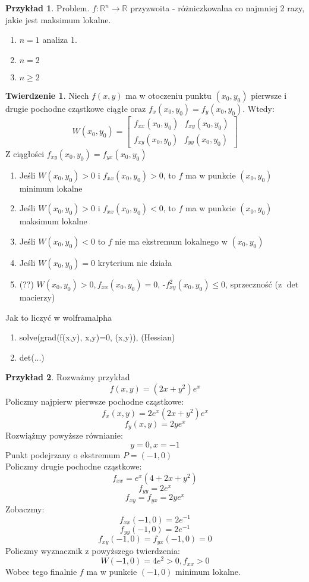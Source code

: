 \documentclass{article}
\theoremstyle{definition}
\theoremstyle{definition}
\newtheorem{tw}{Twierdzenie}[subsection]
\theoremstyle{definition}
\newtheorem{pk}{Przykład}[subsection]
\theoremstyle{definition}
\begin{document}
\begin{pk}
    Problem. $f: \mathbb{R}^n \rightarrow \mathbb{R}$ przyzwoita - różniczkowalna co najmniej 2 razy, jakie jest maksimum lokalne.
    \begin{enumerate}
        \item $n=1$ analiza 1.
        \item $n=2$
        \item $n\geq 2$
    \end{enumerate}
\end{pk}

\begin{tw}
    Niech $f(x,y)$ ma w otoczeniu punktu $(x_0,y_0)$ pierwsze i drugie pochodne cząstkowe ciągłe oraz $f_x(x_0,y_0)=f_y(x_0,y_0)$. Wtedy:
    \[W(x_0,y_0)= \begin{bmatrix}
        f_{xx} (x_0,y_0)  \text{  }  f_{xy} (x_0,y_0) \\
        f_{xy} (x_0,y_0)  \text{  }  f_{yy} (x_0,y_0) 
        \end{bmatrix}  \]
    Z ciągłości $f_{xy} (x_0,y_0) = f_{yx} (x_0,y_0)$
\end{tw}

\begin{enumerate}
    \item Jeśli $W(x_0, y_0) > 0$ i $f_{xx} (x_0,y_0) > 0$, to $f$ ma w punkcie $(x_0,y_0)$ minimum lokalne
    \item Jeśli $W(x_0, y_0) > 0$ i $f_{xx} (x_0,y_0) < 0$, to $f$ ma w punkcie $(x_0,y_0)$ maksimum lokalne
    \item Jeśli $W(x_0, y_0) < 0$ to $f$ nie ma ekstremum lokalnego w $(x_0,y_0)$
    \item Jeśli $W(x_0, y_0) = 0$ kryterium nie działa
    \item (??) $W(x_0, y_0) > 0, f_{xx} (x_0, y_0) = 0$, -$f_{xy}^2 (x_0,y_0) \leq 0$, sprzeczność (z $\det$ macierzy)
\end{enumerate}
Jak to liczyć w wolframalpha

\begin{enumerate}
    \item solve(grad(f(x,y), {x,y})=0, (x,y)), (Hessian)
    \item det(...)
\end{enumerate}

\begin{pk}
    Rozważmy przykład \\
    \[ f(x,y) = (2x+y^2)e^x \]
    Policzmy najpierw pierwsze pochodne cząstkowe:
    \[ f_x(x,y) = 2e^x (2x+y^2)e^x\]
    \[ f_y(x,y) = 2y e^x\]
    Rozwiążmy powyższe równianie:
    \[ y = 0, x = -1\]
    Punkt podejrzany o ekstremum $P=(-1,0)$\\
    Policzmy drugie pochodne cząstkowe:
    \[ f_{xx} = e^x (4 + 2x + y^2) \]
    \[ f_{yy} = 2 e^x\]
    \[ f_{xy} = f_{yx} = 2y e^x\]
    Zobaczmy:
    \[ f_{xx} (-1,0) = 2e^{-1}\]
    \[ f_{yy} (-1,0) = 2e^{-1}\]
    \[ f_{xy} (-1,0) = f_{yx} (-1,0) = 0 \]
    Policzmy wyznacznik z powyższego twierdzenia:
    \[ W(-1, 0) = 4e^2 > 0, f_{xx} > 0 \]
    Wobec tego finalnie $f$ ma w punkcie $(-1,0)$ minimum lokalne.
\end{pk}
\end{document}
